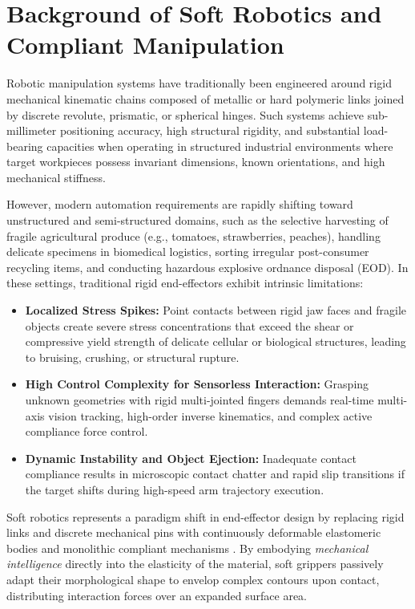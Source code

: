 \documentclass[12pt,a4paper]{report}
\begin{document}
\section{Background of Soft Robotics and Compliant Manipulation}
Robotic manipulation systems have traditionally been engineered around rigid mechanical kinematic chains composed of metallic or hard polymeric links joined by discrete revolute, prismatic, or spherical hinges. Such systems achieve sub-millimeter positioning accuracy, high structural rigidity, and substantial load-bearing capacities when operating in structured industrial environments where target workpieces possess invariant dimensions, known orientations, and high mechanical stiffness.

However, modern automation requirements are rapidly shifting toward unstructured and semi-structured domains, such as the selective harvesting of fragile agricultural produce (e.g., tomatoes, strawberries, peaches), handling delicate specimens in biomedical logistics, sorting irregular post-consumer recycling items, and conducting hazardous explosive ordnance disposal (EOD). In these settings, traditional rigid end-effectors exhibit intrinsic limitations:
\begin{itemize}
    \item \textbf{Localized Stress Spikes:} Point contacts between rigid jaw faces and fragile objects create severe stress concentrations that exceed the shear or compressive yield strength of delicate cellular or biological structures, leading to bruising, crushing, or structural rupture.
    \item \textbf{High Control Complexity for Sensorless Interaction:} Grasping unknown geometries with rigid multi-jointed fingers demands real-time multi-axis vision tracking, high-order inverse kinematics, and complex active compliance force control.
    \item \textbf{Dynamic Instability and Object Ejection:} Inadequate contact compliance results in microscopic contact chatter and rapid slip transitions if the target shifts during high-speed arm trajectory execution.
\end{itemize}

Soft robotics represents a paradigm shift in end-effector design by replacing rigid links and discrete mechanical pins with continuously deformable elastomeric bodies and monolithic compliant mechanisms \cite{whitesides2018soft, rus2015design}. By embodying \textit{mechanical intelligence} directly into the elasticity of the material, soft grippers passively adapt their morphological shape to envelop complex contours upon contact, distributing interaction forces over an expanded surface area.
\end{document}
